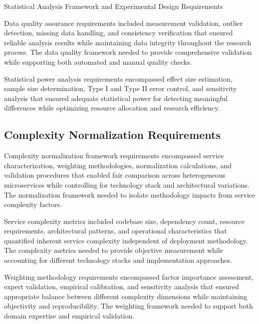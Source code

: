 \begin{table}[H]
\centering
\caption{Statistical Analysis Framework and Experimental Design Requirements}
\label{tab:statistical-analysis-framework}
\end{table}

Data quality assurance requirements included measurement validation, outlier detection, missing data handling, and consistency verification that ensured reliable analysis results while maintaining data integrity throughout the research process. The data quality framework needed to provide comprehensive validation while supporting both automated and manual quality checks.

Statistical power analysis requirements encompassed effect size estimation, sample size determination, Type I and Type II error control, and sensitivity analysis that ensured adequate statistical power for detecting meaningful differences while optimizing resource allocation and research efficiency.

\subsection{Complexity Normalization Requirements}

Complexity normalization framework requirements encompassed service characterization, weighting methodologies, normalization calculations, and validation procedures that enabled fair comparison across heterogeneous microservices while controlling for technology stack and architectural variations. The normalization framework needed to isolate methodology impacts from service complexity factors.

Service complexity metrics included codebase size, dependency count, resource requirements, architectural patterns, and operational characteristics that quantified inherent service complexity independent of deployment methodology. The complexity metrics needed to provide objective measurement while accounting for different technology stacks and implementation approaches.

Weighting methodology requirements encompassed factor importance assessment, expert validation, empirical calibration, and sensitivity analysis that ensured appropriate balance between different complexity dimensions while maintaining objectivity and reproducibility. The weighting framework needed to support both domain expertise and empirical validation.

